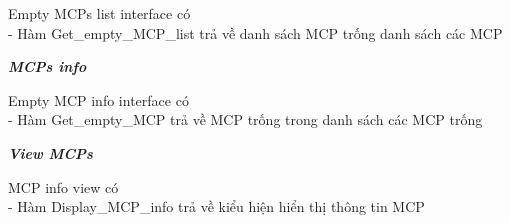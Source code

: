 \documentclass[a4paper]{article}
\begin{document}
\begin{itemize}
\begin{minipage}[b]{0.4\textwidth}
\end{minipage}
\hfill
{}
\newpage
\begin{minipage}[b]{0.4\textwidth}
Empty MCPs list interface có \\
- Hàm Get\_empty\_MCP\_list  trả về danh sách MCP trống  danh sách các MCP
\end{minipage}
\hfill
{}
\newline
\newline
\textbf{    \textit{MCPs info} } \\
\begin{minipage}[b]{0.4\textwidth}
Empty MCP info interface có \\
- Hàm Get\_empty\_MCP trả về MCP trống trong danh sách các MCP trống
\end{minipage}
\hfill
{}
\newline
\newline
\textbf{    \textit{View MCPs} } \\
\begin{minipage}[b]{0.4\textwidth}
  MCP info view  có \\
- Hàm Display\_MCP\_info trả về kiểu hiện hiển thị thông tin MCP
\end{minipage}
\hfill
{}

\end{itemize}
\end{document}
